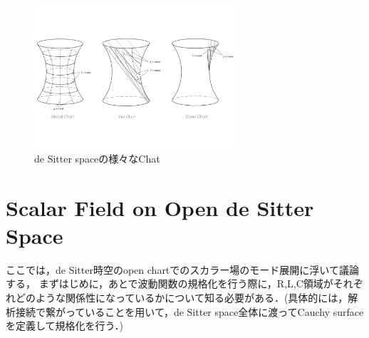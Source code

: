   \begin{figure}[H]
    \begin{center}
    \includegraphics[width=7.5cm,angle=270]{Web.pdf}
    \caption{de Sitter spaceの様々なChat}
    \label{vchart}
    \end{center}
  \end{figure}

\section{Scalar Field on Open de Sitter Space}
ここでは，de Sitter時空のopen chartでのスカラー場のモード展開に浮いて議論する，
まずはじめに，あとで波動関数の規格化を行う際に，R,L,C領域がそれぞれどのような関係性になっているかについて知る必要がある．(具体的には，解析接続で繋がっていることを用いて，de Sitter space全体に渡ってCauchy surfaceを定義して規格化を行う．)
